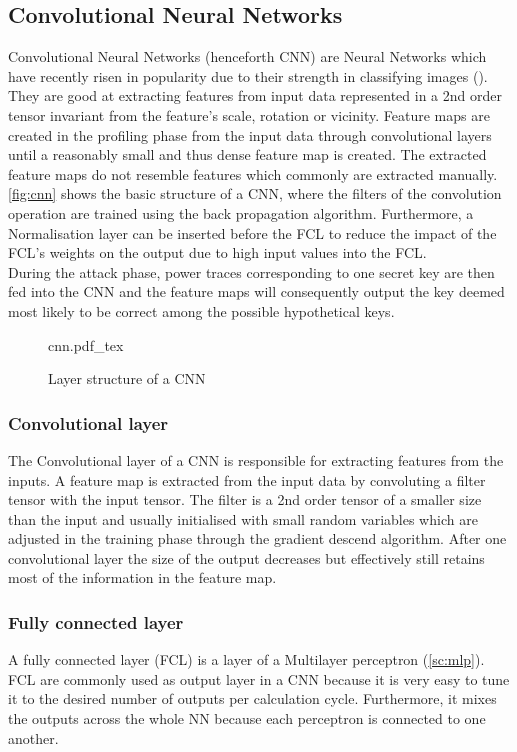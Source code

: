 \documentclass[journal]{IEEEtran}
\begin{document}
\subsection{Convolutional Neural Networks}
\label{ssec:cnn}
Convolutional Neural Networks (henceforth CNN) are Neural Networks which have recently risen in popularity due to their strength in classifying images (\cite{cnn-beats-svm:alex}). They are good at extracting features from input data represented in a 2nd order tensor invariant from the feature's scale, rotation or vicinity. Feature maps are created in the profiling phase from the input data through convolutional layers until a reasonably small and thus dense feature map is created. The extracted feature maps do not resemble features which commonly are extracted manually. \autoref{fig:cnn} shows the basic structure of a CNN, where the filters of the convolution operation are trained using the back propagation algorithm. Furthermore, a Normalisation layer can be inserted before the FCL to reduce the impact of the FCL's weights on the output due to high input values into the FCL.\\
During the attack phase, power traces corresponding to one secret key are then fed into the CNN and the feature maps will consequently output the key deemed most likely to be correct among the possible hypothetical keys. 

\begin{figure}[ht]
	\centering
	\def\svgwidth{\columnwidth}
	{cnn.pdf_tex}
	\caption[Short description of a CNN]{Layer structure of a CNN}
	\label{fig:cnn}
\end{figure}

\subsubsection{Convolutional layer}
The Convolutional layer of a CNN is responsible for extracting features from the inputs. A feature map is extracted from the input data by convoluting a filter tensor with the input tensor. The filter is a 2nd order tensor of a smaller size than the input and usually initialised with small random variables which are adjusted in the training phase through the gradient descend algorithm. After one convolutional layer the size of the output decreases but effectively still retains most of the information in the feature map.  

\subsubsection{Fully connected layer}
\label{sssec:fcl}
A fully connected layer (FCL) is a layer of a Multilayer perceptron (\autoref{sc:mlp}). FCL are commonly used as output layer in a CNN because it is very easy to tune it to the desired number of outputs per calculation cycle. Furthermore, it mixes the outputs across the whole NN because each perceptron is connected to one another. 
\end{document}
